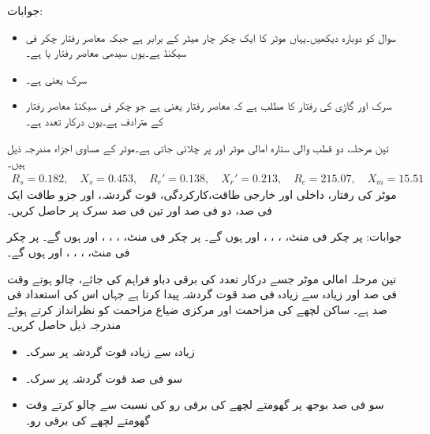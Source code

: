 جوابات:
\begin{itemize}
\item
سوال  کو دوبارہ دیکھیں۔یہاں موٹر کا ایک چکر چار میٹر کے برابر ہے جبکہ معاصر رفتار  چکر فی سیکنڈ ہے۔یوں سیدھی معاصر رفتار  یا  ہے۔ 
\item
سرک  یعنی  ہے۔
\item
سرک  اور گاڑی کی رفتار   کا مطلب ہے کہ معاصر رفتار  یعنی  ہے  جو   چکر فی سیکنڈ معاصر رفتار کے مترادف ہے۔یوں درکار تعدد  ہے۔
\end{itemize}
تین مرحلہ، دو قطب والی ستارہ  امالی موٹر  اور  پر چلائی جاتی ہے۔موٹر کے مساوی اجزاء مندرجہ ذیل ہیں۔
\begin{align*}
R_s=0.182, \quad X_s=0.453,\quad R_r'=0.138,\quad X_r'=0.213,\quad R_c=215.07,\quad X_m=15.51
\end{align*}
موٹر کی رفتار، داخلی اور خارجی طاقت،کارکردگی، قوت گردشہ، اور جزو طاقت ایک فی صد، دو فی صد اور تین فی صد سرک پر حاصل کریں۔

جوابات: پر  چکر فی منٹ، ، ، ،  اور  ہوں گے۔ پر  چکر فی منٹ، ، ، ،  اور  ہوں گے۔ پر  چکر فی منٹ، ، ، ،  اور  ہوں گے۔


تین مرحلہ امالی موٹر  جسے درکار تعدد کی برقی دباو فراہم کی جائے، چالو ہوتے وقت  فی صد اور زیادہ سے زیادہ  فی صد قوت گردشہ پیدا کرتا ہے جہاں اس کی استعداد  فی صد ہے۔ ساکن لچھے کی مزاحمت اور مرکزی ضیاع مزاحمت  کو نظرانداز کرتے ہوئے مندرجہ ذیل حاصل کریں۔
\begin{itemize}
\item
زیادہ سے زیادہ قوت گردشہ پر سرک۔
\item
سو فی صد قوت گردشہ پر سرک۔
\item
سو فی صد بوجھ پر گھومتے لچھے کی برقی رو کی نسبت سے چالو کرتے وقت گھومتے لچھے کی برقی رو۔
\end{itemize}

